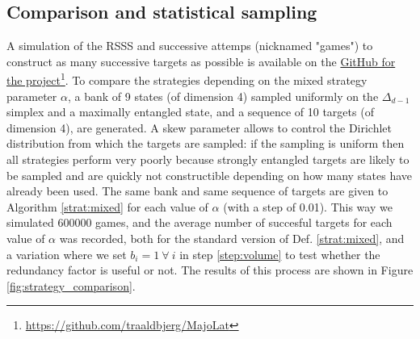 \subsection{Comparison and statistical sampling}

A simulation of the RSSS and successive attemps (nicknamed "games") to construct as many successive targets as possible is available on the \href{https://github.com/traaldbjerg/MajoLat}{GitHub for the project}\footnote{\url{https://github.com/traaldbjerg/MajoLat}}. To compare the strategies depending on the mixed strategy parameter $\alpha$, a bank of 9 states (of dimension 4) sampled uniformly on the $\Delta_{d-1}$ simplex and a maximally entangled state, and a sequence of 10 targets (of dimension 4), are generated. A skew parameter allows to control the Dirichlet distribution from which the targets are sampled: if the sampling is uniform then all strategies perform very poorly because strongly entangled targets are likely to be sampled and are quickly not constructible depending on how many states have already been used. The same bank and same sequence of targets are given to Algorithm \ref{strat:mixed} for each value of $\alpha$ (with a step of 0.01). This way we simulated 600000 games, and the average number of succesful targets for each value of $\alpha$ was recorded, both for the standard version of Def. \ref{strat:mixed}, and a variation where we set $b_i = 1 \: \forall \: i$ in step \ref{step:volume} to test whether the redundancy factor is useful or not. The results of this process are shown in Figure \ref{fig:strategy_comparison}.


